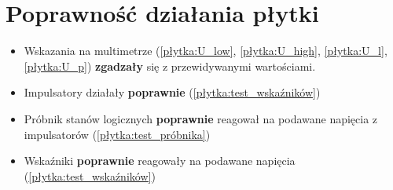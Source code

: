 \section{Poprawność działania płytki}

\begin{itemize}
    \item Wskazania na multimetrze (\ref{płytka:U_low}, \ref{płytka:U_high}, \ref{płytka:U_l}, \ref{płytka:U_p}) \textbf{zgadzały} się z przewidywanymi wartościami.
    \item Impulsatory działały \textbf{poprawnie} (\ref{płytka:test_wskaźników})
    \item Próbnik stanów logicznych \textbf{poprawnie} reagował na podawane napięcia z impulsatorów (\ref{płytka:test_próbnika})
    \item Wskaźniki \textbf{poprawnie} reagowały na podawane napięcia (\ref{płytka:test_wskaźników})
\end{itemize}